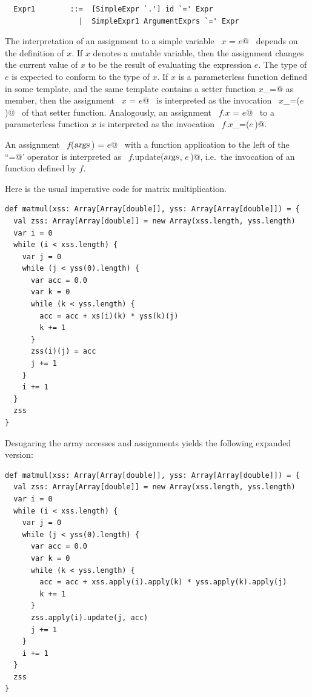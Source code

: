 \syntax\begin{lstlisting}
  Expr1        ::=  [SimpleExpr `.'] id `=' Expr
                 |  SimpleExpr1 ArgumentExprs `=' Expr
\end{lstlisting}

The interpretation of an assignment to a simple variable ~\lstinline@$x$ = $e$@~
depends on the definition of $x$. If $x$ denotes a mutable
variable, then the assignment changes the current value of $x$ to be
the result of evaluating the expression $e$. The type of $e$ is
expected to conform to the type of $x$. If $x$ is a parameterless
function defined in some template, and the same template contains a
setter function \lstinline@$x$_=@ as member, then the assignment
~\lstinline@$x$ = $e$@~ is interpreted as the invocation
~\lstinline@$x$_=($e\,$)@~ of that setter function.  Analogously, an
assignment ~\lstinline@$f.x$ = $e$@~ to a parameterless function $x$
is interpreted as the invocation ~\lstinline@$f.x$_=($e\,$)@.

An assignment ~\lstinline@$f$($\mbox{\sl args}\,$) = $e$@~ with a function application to the
left of the ``\lstinline@=@' operator is interpreted as 
~\lstinline@$f.$update($\mbox{\sl args}$, $e\,$)@, i.e.\
the invocation of an  function defined by $f$.

\example \label{ex:imp-mat-mul}
Here is the usual imperative code for matrix multiplication.

\begin{lstlisting}
def matmul(xss: Array[Array[double]], yss: Array[Array[double]]) = {
  val zss: Array[Array[double]] = new Array(xss.length, yss.length) 
  var i = 0 
  while (i < xss.length) {
    var j = 0 
    while (j < yss(0).length) {
      var acc = 0.0 
      var k = 0 
      while (k < yss.length) {
        acc = acc + xs(i)(k) * yss(k)(j) 
        k += 1
      }
      zss(i)(j) = acc 
      j += 1
    }
    i += 1
  }
  zss
}
\end{lstlisting}
Desugaring the array accesses and assignments yields the following
expanded version:
\begin{lstlisting}
def matmul(xss: Array[Array[double]], yss: Array[Array[double]]) = {
  val zss: Array[Array[double]] = new Array(xss.length, yss.length) 
  var i = 0 
  while (i < xss.length) {
    var j = 0 
    while (j < yss(0).length) {
      var acc = 0.0 
      var k = 0 
      while (k < yss.length) {
        acc = acc + xss.apply(i).apply(k) * yss.apply(k).apply(j) 
        k += 1
      }
      zss.apply(i).update(j, acc) 
      j += 1
    }
    i += 1
  }
  zss
}
\end{lstlisting}


